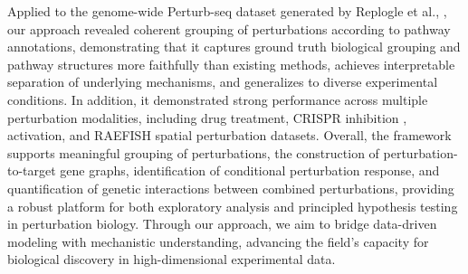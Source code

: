 Applied to the genome-wide Perturb-seq dataset generated by Replogle et al.,
\cite{replogle2022mapping}, our approach revealed coherent grouping of perturbations according to
pathway annotations, demonstrating that it captures ground truth biological grouping and pathway
structures more faithfully than existing methods, achieves interpretable separation of underlying
mechanisms, and generalizes to diverse experimental conditions. In addition, it demonstrated strong
performance across multiple perturbation modalities, including drug treatment\cite{giglio2025heterogeneous},
CRISPR inhibition \cite{replogle2022mapping}, activation\cite{shi2026drug}, and RAEFISH spatial
perturbation datasets\cite{cell2025spatial}. Overall, the framework supports meaningful grouping of
perturbations, the construction of perturbation-to-target gene graphs, {identification of conditional
perturbation response, and quantification of genetic interactions between combined perturbations},
providing a robust platform for both exploratory analysis and principled hypothesis testing in
perturbation biology. Through our approach, we aim to bridge data-driven modeling with mechanistic
understanding, advancing the field's capacity for biological discovery in high-dimensional
experimental data.

